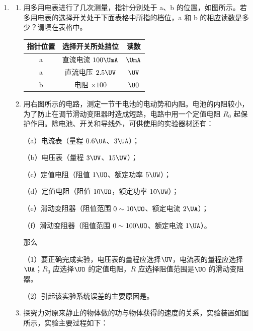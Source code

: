 \documentclass[\gkver]{gaokaozhenti}
\begin{document}
\begin{enumerate}
\item
\begin{enumerate}
	\item
	用多用电表进行了几次测量，指针分别处于 a、b 的位置，如图所示。若多用电表的选择开关处于下面表格中所指的档位，a 和 b 的相应读数是多少？请填在表格中。


	\begin{center}
	\begin{tabular}{|c|c|c|}
	\hline
	指针位置 & 选择开关所处挡位 & 读数 \\ \hline
	a & 直流电流 $100\UmA$ & \tkanswer[1.5cm]{}$\UmA$ \\ \hline
	a & 直流电压 $2.5\UV$ & \tkanswer[1.5cm]{}$\UV$ \\ \hline
	b & 电阻 $\times100$ & \tkanswer[1.5cm]{}$\UO$ \\ \hline
	\end{tabular}
	\end{center}

	\item
	用右图所示的电路，测定一节干电池的电动势和内阻。电池的内阻较小，为了防止在调节滑动变阻器时造成短路，电路中用一个定值电阻 $R_{0}$ 起保护作用。除电池、开关和导线外，可供使用的实验器材还有：

	（a）电流表（量程 $0.6\UA$、$3\UA$）；

	（b）电压表（量程 $3\UV$、$15\UV$）；

	（c）定值电阻（阻值 $1\UO$、额定功率 $5\UW$）；

	（d）定值电阻（阻值 $10\UO$，额定功率 $10\UW$）；

	（e）滑动变阻器（阻值范围 $0\sim10\UO$、额定电流 $2\UA$）；

	（f）滑动变阻器（阻值范围 $0\sim100\UO$、额定电流 $1\UA$）。

	那么

	（1）要正确完成实验，电压表的量程应选择\tkanswer[1.2cm]{}$\UV$，电流表的量程应选择\tkanswer[1.2cm]{}$\UA$；$R_{0}$ 应选择\tkanswer[1.2cm]{}$\UO$ 的定值电阻，$R$ 应选择阻值范围是\tkanswer[1.2cm]{}$\UO$ 的滑动变阻器。

	（2）引起该实验系统误差的主要原因是\tkanswer[6cm]{}。


	\item
	探究力对原来静止的物体做的功与物体获得的速度的关系，实验装置如图所示，实验主要过程如下：


\end{enumerate}
\end{enumerate}
\end{document}
